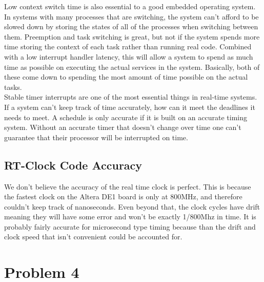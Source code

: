 \documentclass{article}
\begin{document}
Low context switch time is also essential to a good embedded operating system. In systems with many processes that are switching, the system can't afford to be slowed down by storing the states of all of the processes when switching between them. Preemption and task switching is great, but not if the system spends more time storing the context of each task rather than running real code. Combined with a low interrupt handler latency, this will allow a system to spend as much time as possible on
executing the actual services in the system. Basically, both of these come down to spending the most amount of time possible on the actual tasks.\\

Stable timer interrupts are one of the most essential things in real-time systems. If a system can't keep track of time accurately, how can it meet the deadlines it needs to meet. A schedule is only accurate if it is built on an accurate timing system. Without an accurate timer that doesn't change over time one can't guarantee that their processor will be interrupted on time.\\

\subsection*{RT-Clock Code Accuracy}
We don't believe the accuracy of the real time clock is perfect. This is because the fastest clock on the Altera DE1 board is only at 800MHz, and therefore couldn't keep track of nanoseconds. Even beyond that, the clock cycles have drift meaning they will have some error and won't be exactly 1/800Mhz in time. It is probably fairly accurate for microsecond type timing because than the drift and clock speed that isn't convenient could be accounted for.

\section*{Problem 4}
\end{document}

